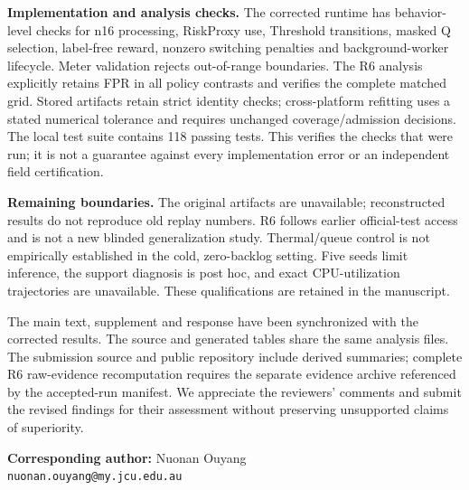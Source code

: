 \documentclass[10pt,a4paper]{article}
\begin{document}
\begin{authorresponsebox}
\textbf{Implementation and analysis checks.} The corrected runtime has behavior-level checks for n16 processing, RiskProxy use, Threshold transitions, masked Q selection, label-free reward, nonzero switching penalties and background-worker lifecycle. Meter validation rejects out-of-range boundaries. The R6 analysis explicitly retains FPR in all policy contrasts and verifies the complete matched grid. Stored artifacts retain strict identity checks; cross-platform refitting uses a stated numerical tolerance and requires unchanged coverage/admission decisions. The local test suite contains 118 passing tests. This verifies the checks that were run; it is not a guarantee against every implementation error or an independent field certification.

\textbf{Remaining boundaries.} The original artifacts are unavailable; reconstructed results do not reproduce old replay numbers. R6 follows earlier official-test access and is not a new blinded generalization study. Thermal/queue control is not empirically established in the cold, zero-backlog setting. Five seeds limit inference, the support diagnosis is post hoc, and exact CPU-utilization trajectories are unavailable. These qualifications are retained in the manuscript.

The main text, supplement and response have been synchronized with the corrected results. The source and generated tables share the same analysis files. The submission source and public repository include derived summaries; complete R6 raw-evidence recomputation requires the separate evidence archive referenced by the accepted-run manifest. We appreciate the reviewers' comments and submit the revised findings for their assessment without preserving unsupported claims of superiority.
\end{authorresponsebox}
\vspace{8pt}\noindent\textbf{Corresponding author:} Nuonan Ouyang\\
\texttt{nuonan.ouyang@my.jcu.edu.au}
\end{document}
